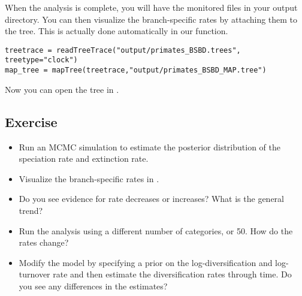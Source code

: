 When the analysis is complete, you will have the monitored files in your output directory.
You can then visualize the branch-specific rates by attaching them to the tree.
This is actually done automatically in our  function.
{\tt \begin{snugshade*}
\begin{lstlisting}
treetrace = readTreeTrace("output/primates_BSBD.trees", treetype="clock")
map_tree = mapTree(treetrace,"output/primates_BSBD_MAP.tree")
\end{lstlisting}
\end{snugshade*}}
Now you can open the tree in \FigTree.




\subsection{Exercise}

\begin{itemize}
\item Run an MCMC simulation to estimate the posterior distribution of the speciation rate and extinction rate.
\item Visualize the branch-specific rates in \FigTree.
\item Do you see evidence for rate decreases or increases? What is the general trend?
\item Run the analysis using a different number of categories,  or 50. How do the rates change?
\item Modify the model by specifying a prior on the log-diversification and log-turnover rate and then estimate the diversification rates through time. Do you see any differences in the estimates? 
\end{itemize}






